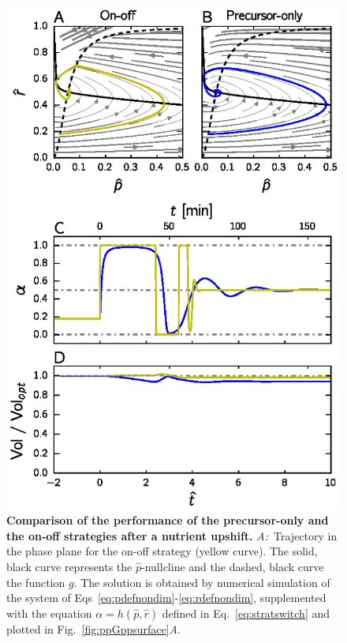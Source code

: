 \begin{figure}
\centering
\includegraphics[scale=1]{./Fig/Fig7.eps}
\caption[Comparison of the performance of the precursor-only and the on-off strategies after a nutrient upshift.]
{
{\bf Comparison of the performance of the precursor-only and the on-off strategies after a nutrient upshift.}\newline
\textit{A:}~Trajectory in the phase plane for the on-off strategy (yellow curve).
The solid, black curve represents the $\hat{p}$-nullcline and the dashed, black curve the function $g$.
The solution is obtained by numerical simulation of the system of Eqs~\ref{eq:pdefnondim}-\ref{eq:rdefnondim}, supplemented with the equation $\alpha = h(\hat{p},\hat{r})$ defined in Eq.~\ref{eq:stratswitch} and plotted in Fig.~\ref{fig:ppGppsurface}\textit{A}.
}
\end{figure}
